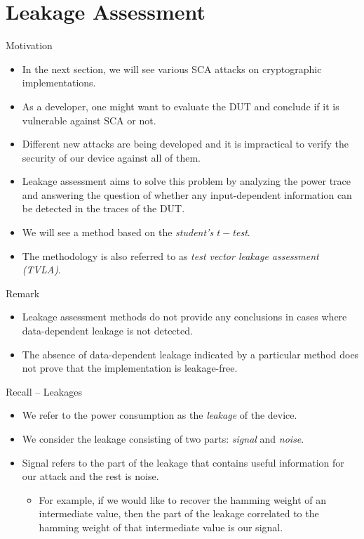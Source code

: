\section{Leakage Assessment}
\begin{frame}{\VideoName}
    \tableofcontents[currentsection]
\end{frame}

\begin{frame}{Motivation}
    \begin{itemize}
        \item In the next section, we will see various SCA attacks on cryptographic implementations.
        \item As a developer, one might want to evaluate the DUT and conclude if it is vulnerable against SCA or not.
        \item Different new attacks are being developed and it is impractical to verify the security of our device against all of them.
        \item Leakage assessment aims to solve this problem by analyzing the power trace and answering the question of whether any input-dependent information can be detected in the traces of the DUT.
        \item We will see a method based on the \textit{student's $t-$test}.
        \item The methodology is also referred to as \textit{test vector leakage assessment (TVLA)}.
    \end{itemize}
\end{frame}

\begin{frame}{Remark}
    \begin{itemize}
        \item Leakage assessment methods do not provide any conclusions in cases where data-dependent leakage is not detected. 
        \item The absence of data-dependent leakage indicated by a particular method does not prove that the implementation is leakage-free.
    \end{itemize}
\end{frame}

\begin{frame}{Recall -- Leakages}
    \begin{itemize}
        \item We refer to the power consumption as the \textit{leakage} of the device.
       \item We consider the leakage consisting of two parts: \textit{signal} and \textit{noise}.
       \item Signal refers to the part of the leakage that contains useful information for our attack and the rest is noise.
       \begin{itemize}
           \item For example, if we would like to recover the hamming weight of an intermediate value, then the part of the leakage correlated to the hamming weight of that intermediate value is our signal.
       \end{itemize}
    \end{itemize}
\end{frame}

